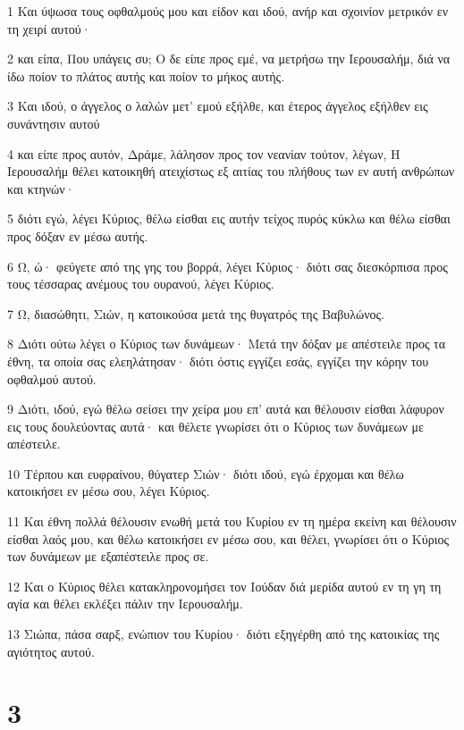 \par 1 Και ύψωσα τους οφθαλμούς μου και είδον και ιδού, ανήρ και σχοινίον μετρικόν εν τη χειρί αυτού·
\par 2 και είπα, Που υπάγεις συ; Ο δε είπε προς εμέ, να μετρήσω την Ιερουσαλήμ, διά να ίδω ποίον το πλάτος αυτής και ποίον το μήκος αυτής.
\par 3 Και ιδού, ο άγγελος ο λαλών μετ' εμού εξήλθε, και έτερος άγγελος εξήλθεν εις συνάντησιν αυτού
\par 4 και είπε προς αυτόν, Δράμε, λάλησον προς τον νεανίαν τούτον, λέγων, Η Ιερουσαλήμ θέλει κατοικηθή ατειχίστως εξ αιτίας του πλήθους των εν αυτή ανθρώπων και κτηνών·
\par 5 διότι εγώ, λέγει Κύριος, θέλω είσθαι εις αυτήν τείχος πυρός κύκλω και θέλω είσθαι προς δόξαν εν μέσω αυτής.
\par 6 Ω, ώ· φεύγετε από της γης του βορρά, λέγει Κύριος· διότι σας διεσκόρπισα προς τους τέσσαρας ανέμους του ουρανού, λέγει Κύριος.
\par 7 Ω, διασώθητι, Σιών, η κατοικούσα μετά της θυγατρός της Βαβυλώνος.
\par 8 Διότι ούτω λέγει ο Κύριος των δυνάμεων· Μετά την δόξαν με απέστειλε προς τα έθνη, τα οποία σας ελεηλάτησαν· διότι όστις εγγίζει εσάς, εγγίζει την κόρην του οφθαλμού αυτού.
\par 9 Διότι, ιδού, εγώ θέλω σείσει την χείρα μου επ' αυτά και θέλουσιν είσθαι λάφυρον εις τους δουλεύοντας αυτά· και θέλετε γνωρίσει ότι ο Κύριος των δυνάμεων με απέστειλε.
\par 10 Τέρπου και ευφραίνου, θύγατερ Σιών· διότι ιδού, εγώ έρχομαι και θέλω κατοικήσει εν μέσω σου, λέγει Κύριος.
\par 11 Και έθνη πολλά θέλουσιν ενωθή μετά του Κυρίου εν τη ημέρα εκείνη και θέλουσιν είσθαι λαός μου, και θέλω κατοικήσει εν μέσω σου, και θέλει, γνωρίσει ότι ο Κύριος των δυνάμεων με εξαπέστειλε προς σε.
\par 12 Και ο Κύριος θέλει κατακληρονομήσει τον Ιούδαν διά μερίδα αυτού εν τη γη τη αγία και θέλει εκλέξει πάλιν την Ιερουσαλήμ.
\par 13 Σιώπα, πάσα σαρξ, ενώπιον του Κυρίου· διότι εξηγέρθη από της κατοικίας της αγιότητος αυτού.

\chapter{3}

